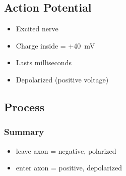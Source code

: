 \documentclass[a4paper,12pt]{article}
\begin{document}
\subsection{Action Potential}
\begin{itemize}
    \item{Excited nerve}
    \item{Charge inside = +\SI{40}{\mV}}
    \item{Lasts milliseconds}
    \item{Depolarized (positive voltage)}
\end{itemize}

\subsection{Process}
\subsubsection{Summary}
\begin{itemize}
    \item{ leave axon = negative, polarized}
    \item{ enter axon = positive, depolarized}
\end{itemize}

\pagebreak
\end{document}
